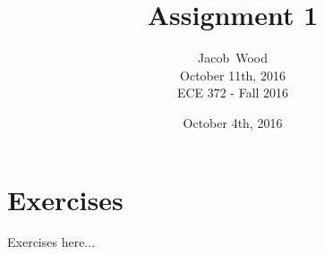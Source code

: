 \documentclass[10pt, onecolumn, draftclsnofoot, letterpaper]{IEEEtran}
\title{Assignment 1}
\date{October 4th, 2016} %
\author{Jacob~Wood \\
		October 11th, 2016 \\
		ECE 372 - Fall 2016}
\begin{document}
\maketitle

\section{Exercises}
Exercises here...
\end{document}
